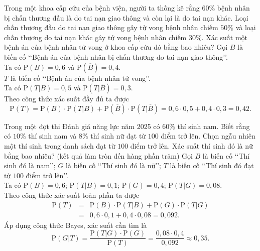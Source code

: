 \begin{ex}%
	Trong một khoa cấp cứu của bệnh viện, người ta thống kê rằng $60\%$ bệnh nhân bị chấn thương đầu là do tai nạn giao thông và còn lại là do tai nạn khác. Loại chấn thương đầu do tai nạn giao thông gây tử vong bệnh nhân chiếm $50\%$ và loại chấn thương do tai nạn khác gây tử vong bệnh nhân chiếm $30\%$. Xác suất một bệnh án của bệnh nhân tử vong ở khoa cấp cứu đó bằng bao nhiêu? 
	\loigiai
	{
		Gọi $B$ là biến cố \lq\lq Bệnh án của bệnh nhân bị chấn thương do tai nạn giao thông\rq\rq.\\ Ta có $\mathrm{P}(B)=0{,}6$ và $\mathrm{P}\left(\overline{B}\right)= 0{,}4$.\\
		$T$ là biến cố \lq\lq Bệnh án của bệnh nhân tử vong\rq\rq.\\ Ta có $\mathrm{P}(T|B)= 0{,}5$ và $\mathrm{P}\left(T|\overline{B}\right)= 0{,}3$.\\
		Theo công thức xác suất đầy đủ ta được
		\[
		\mathrm{P}(T)= \mathrm{P}(B) \cdot \mathrm{P}(T|B) + \mathrm{P}\left(\overline{B}\right) \cdot \mathrm{P}\left(T|\overline{B}\right)= 0{,}6 \cdot 0{,}5 + 0{,}4 \cdot 0{,}3= 0{,}42.
		\]
	}
\end{ex}

\begin{ex}%
	Trong một đợt thi Đánh giá năng lực năm 2025 có $60\%$ thí sinh nam. Biết rằng có $10\%$ thí sinh nam và $8\%$ thí sinh nữ đạt từ $100$ điểm trở lên. Chọn ngẫu nhiên một thí sinh trong danh sách đạt từ $100$ điểm trở lên. Xác suất thí sinh đó là nữ bằng bao nhiêu? (kết quả làm tròn đến hàng phần trăm)
	\loigiai
	{
		Gọi $B$ là biến cố \lq\lq Thí sinh đó là nam\rq\rq; $G$ là biến cố \lq\lq Thí sinh đó là nữ\rq\rq; $T$ là biến cố \lq\lq Thí sinh đó đạt từ $100$ điểm trở lên\rq\rq.\\
		Ta có $\mathrm{P}(B)=0{,}6$; $\mathrm{P}(T|B)= 0{,}1$; $\mathrm{P}(G)=0{,}4$; $\mathrm{P}(T|G)=0{,}08$.\\
		Theo công thức xác suất toàn phần ta được
		\begin{eqnarray*}
			\mathrm{P}(T) &=& \mathrm{P}(B) \cdot \mathrm{P}(T|B)+ \mathrm{P}(G)\cdot \mathrm{P}(T|G)\\
			&=& 0{,}6 \cdot 0{,}1 + 0{,}4 \cdot 0{,}08= 0{,}092.
		\end{eqnarray*}
		Áp dụng công thức Bayes, xác suất cần tìm là
				\[
		\mathrm{P}(G|T)= \dfrac{\mathrm{P}(T|G)\cdot \mathrm{P}(G)}{\mathrm{P}(T)}= \dfrac{0{,}08 \cdot 0{,}4}{0{,}092} \approx 0{,}35. 
		\]
	}
\end{ex}

